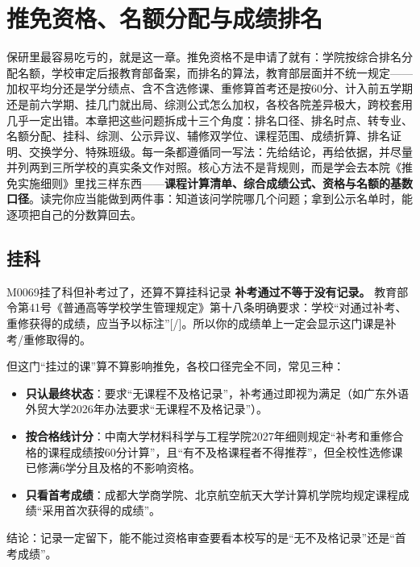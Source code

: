 \chapter{推免资格、名额分配与成绩排名}
\label{ch02}
\begin{keybox}
保研里最容易吃亏的，就是这一章。推免资格不是申请了就有：学院按综合排名分配名额，学校审定后报教育部备案，而排名的算法，教育部层面并不统一规定——加权平均分还是学分绩点、含不含选修课、重修算首考还是按60分、计入前五学期还是前六学期、挂几门就出局、综测公式怎么加权，各校各院差异极大，跨校套用几乎一定出错。本章把这些问题拆成十三个角度：排名口径、排名时点、转专业、名额分配、挂科、综测、公示异议、辅修双学位、课程范围、成绩折算、排名证明、交换学分、特殊班级。每一条都遵循同一写法：先给结论，再给依据，并尽量并列两到三所学校的真实条文作对照。核心方法不是背规则，而是学会去本院《推免实施细则》里找三样东西——\textbf{课程计算清单、综合成绩公式、资格与名额的基数口径}。读完你应当能做到两件事：知道该问学院哪几个问题；拿到公示名单时，能逐项把自己的分数算回去。
\end{keybox}

\section{挂科}
\begin{qa}{M0069}{挂了科但补考过了，还算不算挂科记录}
\textbf{补考通过不等于没有记录。} 教育部令第41号《普通高等学校学生管理规定》第十八条明确要求：学校“对通过补考、重修获得的成绩，应当予以标注”[/]。所以你的成绩单上一定会显示这门课是补考/重修取得的。

但这门“挂过的课”算不算影响推免，各校口径完全不同，常见三种：

\begin{itemize}
  \item \textbf{只认最终状态}：要求“无课程不及格记录”，补考通过即视为满足（如广东外语外贸大学2026年办法要求“无课程不及格记录”）。
  \item \textbf{按合格线计分}：中南大学材料科学与工程学院2027年细则规定“补考和重修合格的课程成绩按60分计算”，且“有不及格课程者不得推荐”，但全校性选修课已修满6学分且及格的不影响资格。
  \item \textbf{只看首考成绩}：成都大学商学院、北京航空航天大学计算机学院均规定课程成绩“采用首次获得的成绩”。
\end{itemize}

结论：记录一定留下，能不能过资格审查要看本校写的是“无不及格记录”还是“首考成绩”。
\end{qa}

